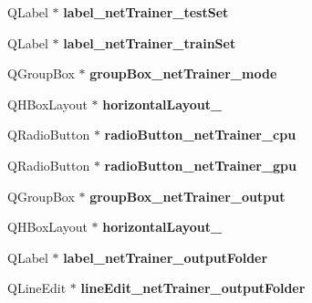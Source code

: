\begin{DoxyCompactItemize}
\item 
\mbox{\label{class_ui___main_window_a9599cbd73b369753d26da25348486385}} 
Q\+Label $\ast$ {\bfseries label\+\_\+net\+Trainer\+\_\+test\+Set}
\item 
\mbox{\label{class_ui___main_window_ae7a5e4e47441ce6e21c6b5354fb692b3}} 
Q\+Label $\ast$ {\bfseries label\+\_\+net\+Trainer\+\_\+train\+Set}
\item 
\mbox{\label{class_ui___main_window_a23d79c30f3c395df3b73060dd7a23114}} 
Q\+Group\+Box $\ast$ {\bfseries group\+Box\+\_\+net\+Trainer\+\_\+mode}
\item 
\mbox{\label{class_ui___main_window_a8ead8fc876ee91c30864822eedb9c370}} 
Q\+H\+Box\+Layout $\ast$ {\bfseries horizontal\+Layout\+\_}
\item 
\mbox{\label{class_ui___main_window_ac138026c6423374f908065677ac7f8ef}} 
Q\+Radio\+Button $\ast$ {\bfseries radio\+Button\+\_\+net\+Trainer\+\_\+cpu}
\item 
\mbox{\label{class_ui___main_window_a9e6d12fda85ad7b54ee4999fd8d0c565}} 
Q\+Radio\+Button $\ast$ {\bfseries radio\+Button\+\_\+net\+Trainer\+\_\+gpu}
\item 
\mbox{\label{class_ui___main_window_af57da853dffd50678de9a613fd15b030}} 
Q\+Group\+Box $\ast$ {\bfseries group\+Box\+\_\+net\+Trainer\+\_\+output}
\item 
\mbox{\label{class_ui___main_window_a3b24c4bb360d79ae2e886fe63c8fdac7}} 
Q\+H\+Box\+Layout $\ast$ {\bfseries horizontal\+Layout\+\_}
\item 
\mbox{\label{class_ui___main_window_a15d2dacb5fd5301c74386b1459d5e950}} 
Q\+Label $\ast$ {\bfseries label\+\_\+net\+Trainer\+\_\+output\+Folder}
\item 
\mbox{\label{class_ui___main_window_aec24e384f7e78b67db6ed1f580ef61c8}} 
Q\+Line\+Edit $\ast$ {\bfseries line\+Edit\+\_\+net\+Trainer\+\_\+output\+Folder}

\end{DoxyCompactItemize}

